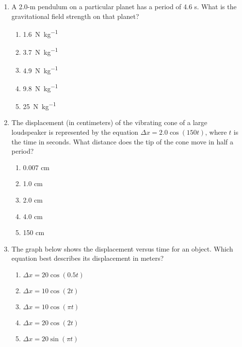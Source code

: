 \documentclass{../../../oss-apphys}
\begin{document}
\begin{multicols}{2}
\begin{enumerate}[leftmargin=18pt]
  \item A 2.0-m pendulum on a particular planet has a period of 4.6 s. What is
    the gravitational field strength on that planet?
    \begin{enumerate}[nosep,leftmargin=18pt,label=(\Alph*)]
    \item\SI{1.6}{\newton\per\kilo\gram}
    \item\SI{3.7}{\newton\per\kilo\gram}
    \item\SI{4.9}{\newton\per\kilo\gram}
    \item\SI{9.8}{\newton\per\kilo\gram}
    \item\SI{25}{\newton\per\kilo\gram}
    \end{enumerate}
    
  \item The displacement (in centimeters) of the vibrating cone of a large
    loudspeaker is represented by the equation $\Delta x=2.0\cos(150t)$, where
    $t$ is the time in seconds. What distance does the tip of the cone move in
    half a period?
    \begin{enumerate}[noitemsep,topsep=0pt,leftmargin=18pt,label=(\Alph*)]
    \item 0.007 cm
    \item 1.0 cm
    \item 2.0 cm
    \item 4.0 cm
    \item 150 cm
    \end{enumerate}

  \item The graph below shows the displacement versus time for an object. Which
    equation best describes its displacement in meters?\\
    \begin{enumerate}[noitemsep,topsep=0pt,leftmargin=18pt,label=(\Alph*)]
    \item $\Delta x=20\cos(0.5t)$
    \item $\Delta x=10\cos(2t)$
    \item $\Delta x=10\cos(\pi t)$
    \item $\Delta x=20\cos(2t)$
    \item $\Delta x=20\sin(\pi t)$
    \end{enumerate}
    \columnbreak
    

\end{enumerate}
\end{multicols}
\end{document}
